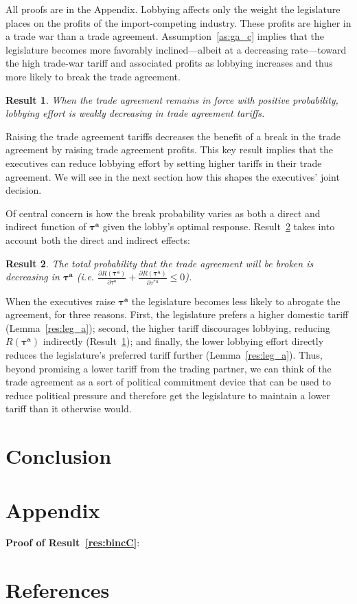 \documentclass[10pt]{article}
\newtheorem{result}{Result}
\newcommand{\bta}{\bm{\tau^a}}
\begin{document}
\noindent All proofs are in the Appendix. Lobbying affects only the weight the legislature places on the profits of the import-competing industry. These profits are higher in a trade war than a trade agreement. Assumption~\ref{as:ga_c} implies that the legislature becomes more favorably inclined---albeit at a decreasing rate---toward the high trade-war tariff and associated profits as lobbying increases and thus more likely to break the trade agreement. 


\begin{result}
  When the trade agreement remains in force with positive probability, lobbying effort is weakly decreasing in trade agreement tariffs.
  \label{res:lobby}
\end{result}

\noindent Raising the trade agreement tariffs decreases the benefit of a break in the trade agreement by raising trade agreement profits. This key result implies that the executives can reduce lobbying effort by setting higher tariffs in their trade agreement. We will see in the next section how this shapes the executives' joint decision. 

Of central concern is how the break probability varies as both a direct and indirect function of $\bta$ given the lobby's optimal response. Result~\ref{res:bcomB} takes into account both the direct and indirect effects:

\begin{result}
	The total probability that the trade agreement will be broken is decreasing in $\bta$ (i.e. $\frac{\partial R(\bta)}{\partial  \tau^a} + \frac{\partial R(\bta)}{\partial  \tau^{*a}} \leq 0$).
	\label{res:bcomB}
\end{result}

\noindent When the executives raise $\bta$ the legislature becomes less likely to abrogate the agreement, for three reasons. First, the legislature prefers a higher domestic tariff (Lemma~\ref{res:leg_a}); second, the higher tariff discourages lobbying, reducing $R(\bta)$ indirectly (Result~\ref{res:lobby}); and finally, the lower lobbying effort directly reduces the legislature's preferred tariff further (Lemma~\ref{res:leg_a}). Thus, beyond promising a lower tariff from the trading partner, we can think of the trade agreement as a sort of political commitment device that can be used to reduce political pressure and therefore get the legislature to maintain a lower tariff than it otherwise would.




\section{Conclusion}
\label{sec:concl}
			




\section{Appendix}
\label{sec:appendix}
\noindent \textbf{\hypertarget{Pr_bincC}{Proof of Result~\ref{res:bincC}}}:\\



\section{References}
\end{document}
